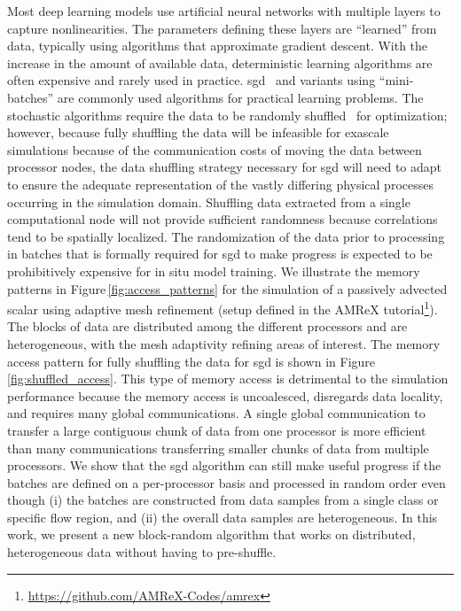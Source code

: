 \documentclass[review]{elsarticle}
\begin{document}
Most deep learning models use artificial neural networks with multiple
layers to capture nonlinearities. The parameters defining these layers
are ``learned'' from data, typically using algorithms that approximate
gradient descent. With the increase in the amount of available data,
deterministic learning algorithms are often expensive and rarely used
in practice.  \Gls{sgd}~\cite{bottou2010large, Goodfellow2016} and
variants using ``mini-batches'' are commonly used algorithms for practical
learning problems. The stochastic algorithms require the data to be
randomly shuffled~\cite{bottou2010large, Goodfellow2016} for
optimization; however, because fully shuffling the data will be
infeasible for exascale simulations because of the communication costs
of moving the data between processor nodes, the data shuffling
strategy necessary for \gls{sgd} will need to adapt to ensure the
adequate representation of the vastly differing physical processes
occurring in the simulation domain. Shuffling data extracted from a
single computational node will not provide sufficient randomness
because correlations tend to be spatially localized. The randomization
of the data prior to processing in batches that is formally required
for \gls{sgd} to make progress is expected to be prohibitively
expensive for in situ model training. We illustrate the memory
patterns in Figure\,\ref{fig:access_patterns} for the simulation of a
passively advected scalar using adaptive mesh refinement (setup
defined in the AMReX
tutorial\footnote{\url{https://github.com/AMReX-Codes/amrex}}). The
blocks of data are distributed among the different processors and are
heterogeneous, with the mesh adaptivity refining areas of
interest. The memory access pattern for fully shuffling the data for
\gls{sgd} is shown in Figure\,\ref{fig:shuffled_access}. This type of
memory access is detrimental to the simulation performance because the
memory access is uncoalesced, disregards data locality, and requires
many global communications. A single global communication to transfer a large
contiguous chunk of data from one processor is more efficient than many
communications transferring smaller chunks of data from multiple processors. We
show that the \gls{sgd} algorithm can still make useful progress if the batches
are defined on a per-processor basis and processed in random order even though
(i) the batches are constructed from data samples from a single class or
specific flow region, and (ii) the overall data samples are heterogeneous. In
this work, we present a new block-random algorithm that works on distributed,
heterogeneous data without having to pre-shuffle.
\end{document}
